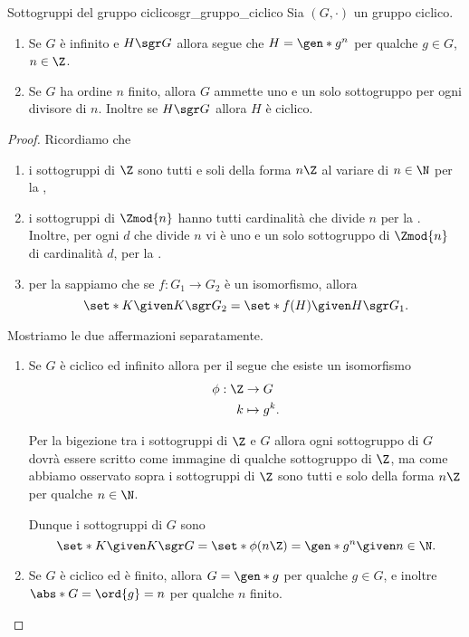 \begin{corollary}
    {Sottogruppi del gruppo ciclico}{sgr_gruppo_ciclico}
    Sia $(G, \cdot)$ un gruppo ciclico.
    \begin{enumerate}[label={(\roman*)}]
        \item Se $G$ è infinito e $H \sgr G$ allora segue che $H = \gen*{g^n}$ per qualche $g \in G$, $n \in \Z$.
        \item Se $G$ ha ordine $n$ finito, allora $G$ ammette uno e un solo sottogruppo per ogni divisore di $n$.
        Inoltre se $H \sgr G$ allora $H$ è ciclico.
    \end{enumerate}
\end{corollary}
\begin{proof}
    Ricordiamo che \begin{enumerate}
        \item i sottogruppi di $\Z$ sono tutti e soli della forma $n\Z$ al variare di $n \in \N$ per la ,
        \item i sottogruppi di $\Zmod{n}$ hanno tutti cardinalità che divide $n$ per la . Inoltre, per ogni $d$ che divide $n$ vi è uno e un solo sottogruppo di $\Zmod{n}$ di cardinalità $d$, per la .
        \item per la  sappiamo che se $f : G_1 \to G_2$ è un isomorfismo, allora \[
            \set*{K \given K \sgr G_2} = \set*{f(H) \given H \sgr G_1}. 
        \]
    \end{enumerate}

    Mostriamo le due affermazioni separatamente.
    \begin{enumerate}[label={(\roman*)}]
        \item Se $G$ è ciclico ed infinito allora per il  segue che esiste un isomorfismo \begin{align*}
            \phi : \Z &\to G \\
            k &\mapsto g^k.
        \end{align*}

        Per la bigezione tra i sottogruppi di $\Z$ e $G$ allora ogni sottogruppo di $G$ dovrà essere scritto come immagine di qualche sottogruppo di $\Z$, ma come abbiamo osservato sopra i sottogruppi di $\Z$ sono tutti e solo della forma $n\Z$ per qualche $n \in \N$.
        
        Dunque i sottogruppi di $G$ sono \[
            \set*{K \given K \sgr G} = \set*{\phi(n\Z) = \gen*{g^n} \given n \in \N}.    
        \]
        \item Se $G$ è ciclico ed è finito, allora $G = \gen*{g}$ per qualche $g \in G$, e inoltre $\abs*{G} = \ord{g} = n$ per qualche $n$ finito.
        

\end{enumerate}
\end{proof}
